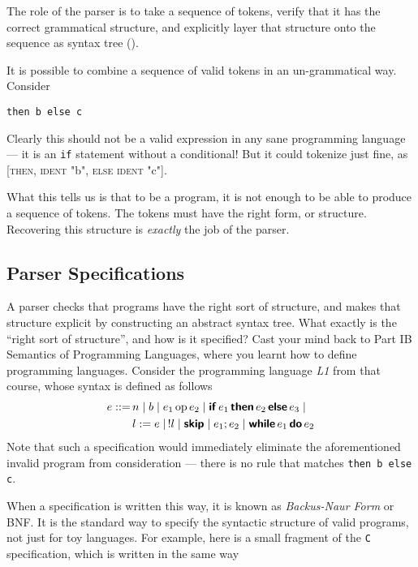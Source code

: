 The role of the parser is to take a sequence of tokens, verify that it has the correct grammatical structure, and explicitly layer that structure onto the sequence as syntax tree ().

It is possible to combine a sequence of valid tokens in an un-grammatical way. Consider
\begin{verbatim}
then b else c
\end{verbatim}
Clearly this should not be a valid expression in any sane programming language --- it is an \texttt{if} statement without a conditional! But it could tokenize just fine, as [\textsc{then}, \textsc{ident} "b", \textsc{else} \textsc{ident} "c"].

What this tells us is that to be a program, it is not enough to be able to produce a sequence of tokens. The tokens must have the right form, or structure. Recovering this structure is \textit{exactly} the job of the parser.

\subsection{Parser Specifications}\label{section:parser-generators}
A parser checks that programs have the right sort of structure, and makes that structure explicit by constructing an abstract syntax tree. What exactly is the ``right sort of structure'', and how is it specified? Cast your mind back to \textsf{Part IB Semantics of Programming Languages}, where you learnt how to define programming languages. Consider the programming language \textit{L1} from that course, whose syntax is defined as follows
\begin{align*}
    e ::= & \, n \mid b \mid e_1 \, \text{op} \, e_2 \mid \textbf{\textsf{if}} \, e_1 \, \textbf{\textsf{then}} \, e_2 \, \textbf{\textsf{else}} \, e_3 \mid \\
    & \, l := e \mid \, !l \mid \textbf{\textsf{skip}} \mid e_1 ; e_2 \mid \textbf{\textsf{while}} \, e_1 \, \textbf{\textsf{do}} \, e_2
\end{align*}
Note that such a specification would immediately eliminate the aforementioned invalid program from consideration --- there is no rule that matches \texttt{then b else c}.

When a specification is written this way, it is known as \textit{Backus-Naur Form} or BNF. It is the standard way to specify the syntactic structure of valid programs, not just for toy languages. For example, here is a small fragment of the \texttt{C} specification, which is written in the same way

